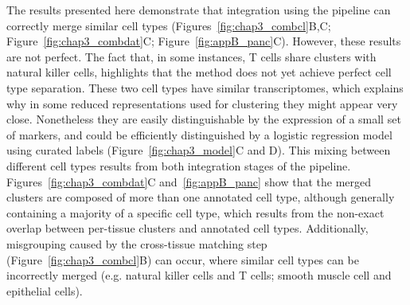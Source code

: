 The results presented here demonstrate that integration using the pipeline can correctly merge similar cell types (Figures~\ref{fig:chap3_combcl}B,C; Figure~\ref{fig:chap3_combdat}C; Figure~\ref{fig:appB_panc}C). However, these results are not perfect. The fact that, in some instances, T cells share clusters with natural killer cells, highlights that the method does not yet achieve perfect cell type separation. These two cell types have similar transcriptomes, which explains why in some reduced representations used for clustering they might appear very close. Nonetheless they are easily distinguishable by the expression of a small set of markers, and could be efficiently distinguished by a logistic regression model using curated labels (Figure~\ref{fig:chap3_model}C and D). This mixing between different cell types results from both integration stages of the pipeline. Figures~\ref{fig:chap3_combdat}C and~\ref{fig:appB_panc} show that the merged clusters are composed of more than one annotated cell type, although generally containing a majority of a specific cell type, which results from the non-exact overlap between per-tissue clusters and annotated cell types. Additionally, misgrouping caused by the cross-tissue matching step (Figure~\ref{fig:chap3_combcl}B) can occur, where similar cell types can be incorrectly merged (e.g. natural killer cells and T cells; smooth muscle cell and epithelial cells). 

